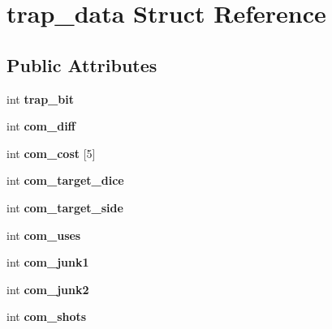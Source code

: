 \hypertarget{structtrap__data}{\section{trap\-\_\-data Struct Reference}
\label{structtrap__data}
}
\subsection*{Public Attributes}
\begin{DoxyCompactItemize}
\item 
\hypertarget{structtrap__data_a8862ab3a9cdd7a46361828ad2a66f4ea}{int {\bfseries trap\-\_\-bit}}\label{structtrap__data_a8862ab3a9cdd7a46361828ad2a66f4ea}

\item 
\hypertarget{structtrap__data_af3019df03bad941a94dd302148fbc9bc}{int {\bfseries com\-\_\-diff}}\label{structtrap__data_af3019df03bad941a94dd302148fbc9bc}

\item 
\hypertarget{structtrap__data_a7fc8b6dcd536d8d63a5826c571abeb62}{int {\bfseries com\-\_\-cost} \mbox{[}5\mbox{]}}\label{structtrap__data_a7fc8b6dcd536d8d63a5826c571abeb62}

\item 
\hypertarget{structtrap__data_a9c541517f734cc1da551544fa45c447d}{int {\bfseries com\-\_\-target\-\_\-dice}}\label{structtrap__data_a9c541517f734cc1da551544fa45c447d}

\item 
\hypertarget{structtrap__data_ab14e1fb2b159a949893e1addbd2ebff7}{int {\bfseries com\-\_\-target\-\_\-side}}\label{structtrap__data_ab14e1fb2b159a949893e1addbd2ebff7}

\item 
\hypertarget{structtrap__data_a26de1e8bbeb88857f796cc1c6febd6b7}{int {\bfseries com\-\_\-uses}}\label{structtrap__data_a26de1e8bbeb88857f796cc1c6febd6b7}

\item 
\hypertarget{structtrap__data_a91389c44ac1d642e16f3d0d3cec70090}{int {\bfseries com\-\_\-junk1}}\label{structtrap__data_a91389c44ac1d642e16f3d0d3cec70090}

\item 
\hypertarget{structtrap__data_a87412179e09e3391a250a325070bb691}{int {\bfseries com\-\_\-junk2}}\label{structtrap__data_a87412179e09e3391a250a325070bb691}

\item 
\hypertarget{structtrap__data_a71be0cfd4d1a92555b4864c70ed34988}{int {\bfseries com\-\_\-shots}}\label{structtrap__data_a71be0cfd4d1a92555b4864c70ed34988}


\end{DoxyCompactItemize}
